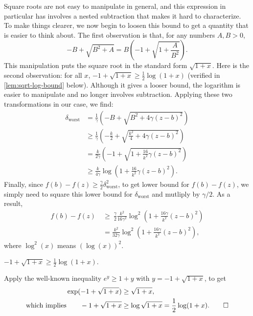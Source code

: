\begin{lproof}
Square roots are not easy to manipulate in general, and this expression in particular has involves a nested subtraction that makes it hard to characterize.
To make things clearer, we now begin to loosen this bound to get a quantity that
    is easier to think about.
The first observation is that, for any numbers $A, B > 0$,
\[
    - B + \sqrt{B^2 + A} = B \left( -1 + \sqrt{1 + \frac{A}{B^2}} \right).
\]
This manipulation puts the square root in the standard form $\sqrt{1 + x}$.
Here is the second observation: for all $x$, $-1 + \sqrt{1+ x} \ge \frac12 \log(1+ x)$
    (verified in \cref{lem:sqrt-log-bound} below).
Although it gives a looser bound, the logarithm is easier to manipulate and no longer involves subtraction.
Applying these two transformations in our case, we find:
\begin{align*}
     \delta_{\text{worst}} &=
     \frac{1}{\gamma}
        \left( - B + \sqrt{ B^2 + 4 \gamma (z-b)^2 } \right)\\
    &\ge \frac{1}{\gamma}
        \left( - \frac k2 + \sqrt{ \frac{k^2}{4} + 4 \gamma (z-b)^2 } \right)\\
    &= \frac{k}{2 \gamma}
       \left( -1 + \sqrt{ 1 + \frac{16}{k^2} \gamma  (z-b)^2 } \right)
       \\
    &\ge \frac{k}{4\gamma}
        \log \left( 1 +  \frac{16}{k^2} \gamma (z-b)^2 \right)
    .
\end{align*}
Finally, since $f(b) - f(z) \ge \frac\gamma2 \delta_{\text{worst}}^2$, to get lower bound for $f(b) - f(z)$, we simply need to square this lower bound for $\delta_{\text{worst}}$ and mutliply by $\gamma/2$.
As a result,
\begin{align*}
    f(b) - f(z) ~&\ge~
    \frac\gamma2 \frac{k^2}{16 \gamma^2}
        \log^2 \left(
            1 +  \frac{16 \gamma}{k^2} (z-b)^2 
        \right)
        \\
    &= \frac{k^2}{32 \gamma}
            \log^2 \left(
                1 +  \frac{16 \gamma}{k^2} (z-b)^2
             \right)
        ,
\end{align*}
where $\log^2(x)$ means $(\log(x))^2$.
\end{lproof}

\begin{lemma}\label{lem:sqrt-log-bound}
    $-1 + \sqrt{1+ x} \ge \frac12 \log(1+ x)$.
\end{lemma}
\begin{lproof}
    Apply the well-known inequality $e^{y} \ge 1 + y$
    with $y = -1 + \sqrt{1 + x}$, to get
    \begin{align*}
        \exp(-1 + \sqrt{1+x}) &\ge \sqrt{1+x}, \\
        \text{which implies}\qquad
        -1 + \sqrt{1+x} &\ge \log \sqrt{1+x}
            = \frac12 \log(1+x).
            \qedhere
    \end{align*}
\end{lproof}

